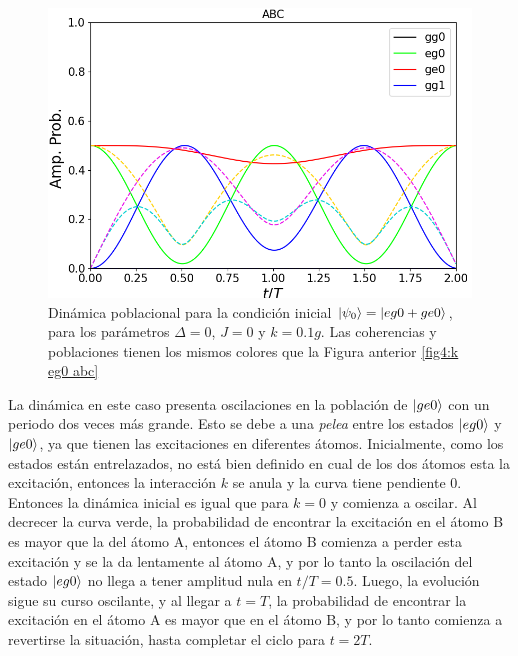 \begin{figure}[h]
    \begin{minipage}[c]{0.67\textwidth}
        \includegraphics[width=\textwidth]{figuras/ch4/k eg0+ ABC.png}
    \end{minipage}\hfill
    \begin{minipage}[c]{0.3\textwidth}
    \caption{Dinámica poblacional para la condición inicial $\ket{\psi_0}=\ket{eg0+ge0}$, para los parámetros $\Delta=0$, $J=0$ y $k=0.1g$. Las coherencias y poblaciones tienen los mismos colores que la Figura anterior \ref{fig4:k eg0 abc}}
    \label{fig4:k eg0 sim abc}
  \end{minipage}
\end{figure}
La dinámica en este caso presenta oscilaciones en la población de $\ket{ge0}$ con un periodo dos veces más grande. Esto se debe a una \textit{pelea} entre los estados $\ket{eg0}$ y $\ket{ge0}$, ya que tienen las excitaciones en diferentes átomos. Inicialmente, como los estados están entrelazados, no está bien definido en cual de los dos átomos esta la excitación, entonces la interacción $k$ se anula y la curva tiene pendiente 0. Entonces la dinámica inicial es igual que para $k=0$ y comienza a oscilar. Al decrecer la curva verde, la probabilidad de encontrar la excitación en el átomo B es mayor que la del átomo A, entonces el átomo B comienza a perder esta excitación y se la da lentamente al átomo A, y por lo tanto la oscilación del estado $\ket{eg0}$ no llega a tener amplitud nula en $t/T=0.5$. Luego, la evolución sigue su curso oscilante, y al llegar a $t=T$, la probabilidad de encontrar la excitación en el átomo A es mayor que en el átomo B, y por lo tanto comienza a revertirse la situación, hasta completar el ciclo para $t=2T$. 

